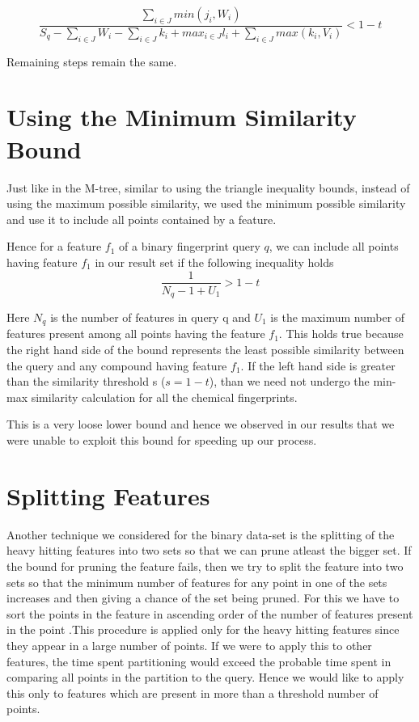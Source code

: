 \begin{equation}
\label{nonbineq2}
\frac{\sum\limits_{i \in J}min(j_i,W_i)}{S_q - \sum\limits_{i \in J}W_i -\sum\limits_{i \in J}k_i + max_{i \in J}l_i + \sum\limits_{i \in J}max (k_i, V_i)}  < 1-t
\end{equation}	

Remaining steps remain the same.

\section{Using the Minimum Similarity Bound}

Just like in the M-tree, similar to using the triangle inequality bounds, instead of using the maximum possible similarity, we used the minimum possible similarity and use it to include all points contained by a feature.

Hence for a feature $f_1$ of a binary fingerprint query $q$, we can include all points having feature $f_1$ in our result set if the following inequality holds
\begin{equation}
\frac{1}{N_q - 1 + U_{1}}  > 1-t
\end{equation}

Here $N_q$ is the number of features in query q and $U_{1}$ is the maximum number of features present among all points having the feature $f_1$. This holds true because the right hand side of the bound represents the least possible similarity between the query and any compound having feature $f_1$. If the left hand side is greater than the similarity threshold s ($s=1-t$), than we need not undergo the min-max similarity calculation for all the chemical fingerprints.

This is a very loose lower bound and hence we observed in our results that we were unable to exploit this bound for speeding up our process.
	


\section{Splitting Features}

Another technique we considered for the binary data-set is the splitting of the heavy hitting features into two sets so that we can prune atleast the bigger set. If the bound for pruning the feature fails, then we try to split the feature into two sets so that the minimum number of features for any point in one of the sets increases and then giving a chance of the set being pruned. For this we have to sort the points in the feature in ascending order of the number of features present in the point .This procedure is applied only for the heavy hitting features since they appear in a large number of points. If we were to apply this to other features, the time spent partitioning would exceed the probable time spent in comparing all points in the partition to the query. Hence we would like to apply this only to features which are present in more than a threshold number of points.\\


